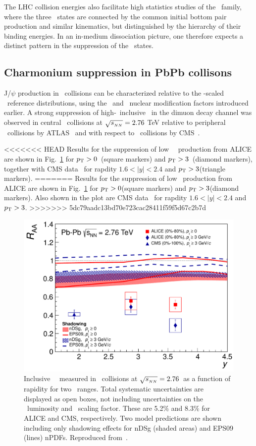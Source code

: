 The LHC collision energies also facilitate high statistics studies of the \PgU\ family, where
the three \PgUn\ states are connected by the common initial bottom pair production and
similar kinematics, but distinguished by the hierarchy of their binding energies. In an
in-medium dissociation picture, one therefore expects a distinct pattern in the suppression
of the \PgUn\ states.

\subsection{Charmonium suppression in PbPb collisons}

J/$\psi$ production in \PbPb\ collisions can be characterized relative to the \Ncoll-scaled \pp\ reference
distributions, using the \Rcp\ and \Raa\ nuclear modification factors introduced earlier.
A strong suppression of high-\pT\ inclusive \jpsi\ in the dimuon decay channel was observed in central \PbPb\ collisions
at $\sqrt{s_{_{NN}}} = 2.76$ TeV  relative to peripheral \PbPb\ collisions by ATLAS~\cite{Aad:2010aa} 
and with respect to \pp\ collisions by CMS~\cite{Chatrchyan:2012np}.

<<<<<<< HEAD
Results for the suppression of low \pT\ \jpsi\ production from ALICE are shown 
in Fig.~\ref{fig:GR:raavsy} for $\mbox{$p_{\mathrm{T}}$} > 0$\GeVc\ (square markers) and 
$\mbox{$p_{\mathrm{T}}$} > 3$\GeVc\ (diamond markers), together with CMS data~\cite{Chatrchyan:2012np} 
for rapdity $ 1.6 < |y| < 2.4 $ and $\mbox{$p_{\mathrm{T}}$} > 3$\GeVc (triangle markers). 
=======
Results for the suppression of low \pT \jpsi\ production from ALICE are shown
in Fig.~\ref{fig:GR:raavsy} for $\mbox{$p_{\mathrm{T}}$} > 0$\GeVc (square markers) and
$\mbox{$p_{\mathrm{T}}$} > 3$\GeVc (diamond markers). Also shown in the plot are CMS data~\cite{Chatrchyan:2012np}
for rapdity $ 1.6 < |y| < 2.4 $ and $\mbox{$p_{\mathrm{T}}$} > 3$\GeVc.
>>>>>>> 5dc79aadc13bd70e723cac28411f59f5d67c2b7d

\begin{figure}
\begin{center}
\includegraphics[width=0.49\linewidth]{qqbarfigures/RAAvsY_v7-eps-converted-to.pdf}
\caption{ \label{fig:GR:raavsy}  Inclusive \jpsi\ \Raa\ measured in \PbPb\
collisions at $\sqrt{s_{_{NN}}} = 2.76$\TeV\ as a function of  rapidity for two \pT\ ranges.
Total systematic uncertainties are displayed as open boxes, not including
uncertainties on the \pp\ luminosity and \Taa\ scaling factor.  These are
5.2\% and  8.3\% for ALICE and CMS, respectively.
Two model predictions are shown~\cite{Ferreiro:2011rw,Vogt:2010aa} including only shadowing effects
for  nDSg (shaded areas) and EPS09 (lines) nPDFs. Reproduced from~\cite{}.}
\end{center}
\end{figure}

